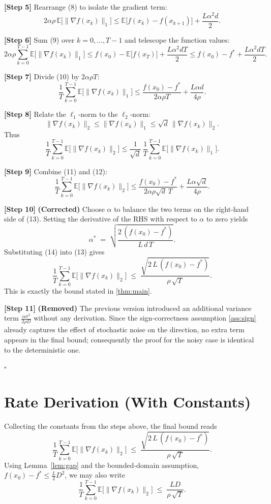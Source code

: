 \documentclass{article}
\newcommand{\E}{\mathbb{E}}
\begin{document}
\noindent\textbf{[Step 5]} Rearrange (8) to isolate the gradient term:
\[
2\alpha\rho\,\E\!\bigl[\|\nabla f(x_k)\|_{1}\bigr]
\le \E\bigl[f(x_k)-f(x_{k+1})\bigr]
   +\frac{L\alpha^{2}d}{2}.
\tag{9}
\]

\noindent\textbf{[Step 6]} Sum (9) over $k=0,\dots,T-1$ and telescope the function values:
\[
2\alpha\rho\sum_{k=0}^{T-1}\E\!\bigl[\|\nabla f(x_k)\|_{1}\bigr]
\le f(x_0)-\E\bigl[f(x_T)\bigr]
   +\frac{L\alpha^{2}dT}{2}
\le f(x_0)-f^{*}+\frac{L\alpha^{2}dT}{2}.
\tag{10}
\]

\noindent\textbf{[Step 7]} Divide (10) by $2\alpha\rho T$:
\[
\frac{1}{T}\sum_{k=0}^{T-1}\E\!\bigl[\|\nabla f(x_k)\|_{1}\bigr]
\le \frac{f(x_0)-f^{*}}{2\alpha\rho T}
   +\frac{L\alpha d}{4\rho } .
\tag{11}
\]

\noindent\textbf{[Step 8]} Relate the $\ell_{1}$‑norm to the $\ell_{2}$‑norm:
\[
\|\nabla f(x_k)\|_{2}\le\|\nabla f(x_k)\|_{1}
\le\sqrt{d}\,\|\nabla f(x_k)\|_{2}.
\]
Thus
\[
\frac{1}{T}\sum_{k=0}^{T-1}\E\!\bigl[\|\nabla f(x_k)\|_{2}\bigr]
\le \frac{1}{\sqrt{d}}\,
      \frac{1}{T}\sum_{k=0}^{T-1}\E\!\bigl[\|\nabla f(x_k)\|_{1}\bigr].
\tag{12}
\]

\noindent\textbf{[Step 9]} Combine (11) and (12):
\[
\frac{1}{T}\sum_{k=0}^{T-1}\E\!\bigl[\|\nabla f(x_k)\|_{2}\bigr]
\le
\frac{f(x_0)-f^{*}}{2\alpha\rho\sqrt{d}\,T}
   +\frac{L\alpha\sqrt{d}}{4\rho } .
\tag{13}
\]

\noindent\textbf{[Step 10]} \textbf{(Corrected)} Choose $\alpha$ to balance the two
terms on the right‑hand side of (13).  Setting the derivative of the RHS with
respect to $\alpha$ to zero yields
\[
\alpha^{*}
\;=\;
\sqrt{\frac{2\,(f(x_0)-f^{*})}{L\,d\,T}} .
\tag{14}
\]
Substituting (14) into (13) gives
\[
\frac{1}{T}\sum_{k=0}^{T-1}\E\!\bigl[\|\nabla f(x_k)\|_{2}\bigr]
\;\le\;
\frac{\sqrt{2\,L\,(f(x_0)-f^{*})}}{\rho\,\sqrt{T}} .
\tag{15}
\]
This is exactly the bound stated in \eqref{thm:main}.

\noindent\textbf{[Step 11]} \textbf{(Removed)} The previous version introduced an
additional variance term $\frac{\alpha\sigma^{2}}{2\rho D}$ without any
derivation.  Since the sign‑correctness assumption \ref{ass:sign} already
captures the effect of stochastic noise on the direction, no extra term
appears in the final bound; consequently the proof for the noisy case is
identical to the deterministic one.

\hfill $\square$

\section*{Rate Derivation (With Constants)}
Collecting the constants from the steps above, the final bound reads
\[
\boxed{
\frac{1}{T}\sum_{k=0}^{T-1}\E\!\bigl[\|\nabla f(x_k)\|_{2}\bigr]
\;\le\;
\frac{\sqrt{2\,L\,(f(x_0)-f^{*})}}{\rho\,\sqrt{T}} .
}
\]
Using Lemma~\ref{lem:gap} and the bounded‑domain assumption,
$f(x_0)-f^{*}\le \tfrac{L}{2}D^{2}$, we may also write
\[
\frac{1}{T}\sum_{k=0}^{T-1}\E\!\bigl[\|\nabla f(x_k)\|_{2}\bigr]
\;\le\;
\frac{L D}{\rho\,\sqrt{T}} .
\]
\end{document}
